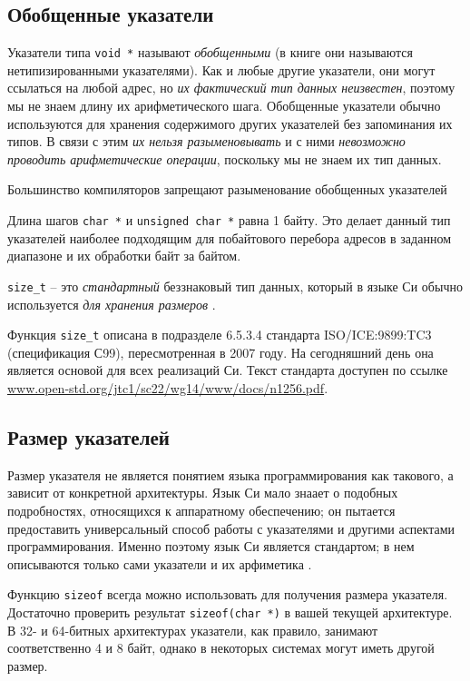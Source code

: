 \documentclass[%
	11pt,
	a4paper,
	utf8,
		]{article}
\begin{document}
\subsection{Обобщенные указатели}

Указатели типа \verb|void *| называют \emph{обобщенными} \cite[]{amini-extreme-c:2022} (в книге \cite{prokhorenok-prog-c:2020} они называются нетипизированными указателями). Как и любые другие указатели, они могут ссылаться на любой адрес, но \emph{их фактический тип данных неизвестен}, поэтому мы не знаем длину их арифметического шага. Обобщенные указатели обычно используются для хранения содержимого других указателей без запоминания их типов. В связи с этим \emph{их нельзя разыменовывать} и с ними \emph{невозможно  проводить арифметические операции}, поскольку мы не знаем их тип данных. 

{\color{blue} Большинство компиляторов запрещают разыменование обобщенных указателей}

Длина шагов \verb|char *| и \verb|unsigned char *| равна 1 байту. Это делает данный тип указателей наиболее подходящим для побайтового перебора адресов в заданном диапазоне и их обработки байт за байтом.

\verb|size_t| -- это \emph{стандартный} беззнаковый тип данных, который в языке Си обычно используется \emph{для хранения размеров} \cite[]{amini-extreme-c:2022}.

Функция \verb|size_t| описана в подразделе 6.5.3.4 стандарта ISO/ICE:9899:TC3 (спецификация С99), пересмотренная в 2007 году. На сегодняшний день она является основой для всех реализаций Си. Текст стандарта доступен по ссылке \url{www.open-std.org/jtc1/sc22/wg14/www/docs/n1256.pdf}.

\subsection{Размер указателей}

Размер указателя не является понятием языка программирования как такового, а зависит от конкретной архитектуры. Язык Си мало знаает о подобных подробностях, относящихся к аппаратному обеспечению; он пытается предоставить универсальный способ работы с указателями и другими аспектами программирования. Именно поэтому язык Си является стандартом; в нем описываются только сами указатели и их арфиметика \cite[]{amini-extreme-c:2022}.

Функцию \verb|sizeof| всегда можно использовать для получения размера указателя. Достаточно проверить результат \verb|sizeof(char *)| в вашей текущей архитектуре. В 32- и 64-битных архитектурах указатели, как правило, занимают соответственно 4 и 8 байт, однако в некоторых системах могут иметь другой размер.
\end{document}
